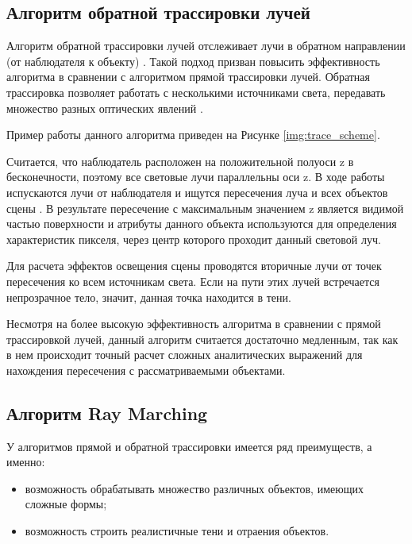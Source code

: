 \subsection{Алгоритм обратной трассировки лучей}

Алгоритм обратной трассировки лучей отслеживает лучи в обратном направлении (от наблюдателя к объекту) \cite{shykin}. Такой подход призван повысить эффективность алгоритма в сравнении с алгоритмом прямой трассировки лучей. Обратная трассировка позволяет работать с несколькими источниками света, передавать множество разных оптических явлений \cite{snizko}.

Пример работы данного алгоритма приведен на Рисунке \ref{img:trace_scheme}.


Считается, что наблюдатель расположен на положительной полуоси z в бесконечности, поэтому все световые лучи параллельны оси z. В ходе работы испускаются лучи от наблюдателя и ищутся пересечения луча и всех объектов сцены \cite{bayackovskiy}. В результате пересечение с максимальным значением z является видимой частью поверхности и атрибуты данного объекта используются для определения характеристик пикселя, через центр которого проходит данный световой луч. 

Для расчета эффектов освещения сцены проводятся вторичные лучи от точек пересечения ко всем источникам света. Если на пути этих лучей встречается непрозрачное тело, значит, данная точка находится в тени.

Несмотря на более высокую эффективность алгоритма в сравнении с прямой трассировкой лучей, данный алгоритм считается достаточно медленным, так как в нем происходит точный расчет сложных аналитических выражений для нахождения пересечения с рассматриваемыми объектами.

\subsection{Алгоритм Ray Marching}

У алгоритмов прямой и обратной трассировки имеется ряд преимуществ, а именно:
\begin{itemize}
    \item возможность обрабатывать множество различных объектов, имеющих сложные формы;
    \item возможность строить реалистичные тени и отраения объектов.
\end{itemize}

